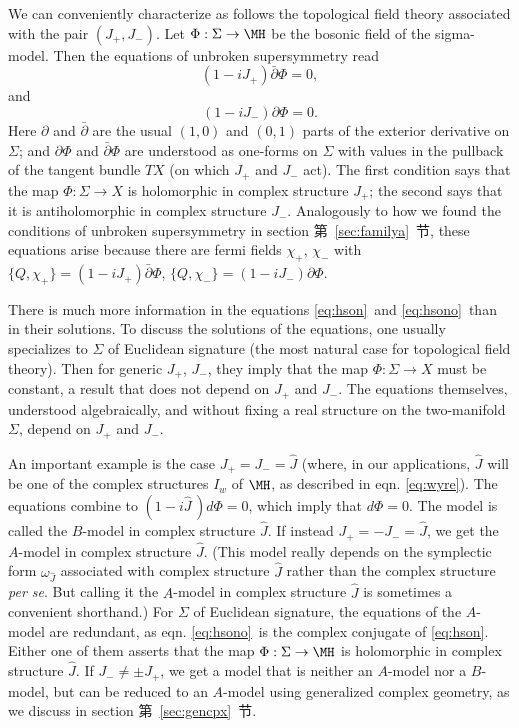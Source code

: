 We can conveniently characterize as follows the topological field
theory associated with the pair $(J_+,J_-)$.  Let $\Phi: \Sigma\to
\MH$ be the bosonic field of the sigma-model.   Then the equations
of unbroken supersymmetry read
\setcounter{equation}{4}
\begin{equation}\label{eq:hson}
(1-iJ_+)\bar\partial\Phi=0,
\end{equation}
 and
\setcounter{equation}{5}
\begin{equation}\label{eq:hsono}
(1-iJ_-)\partial \Phi=0.
\end{equation}
  Here $\partial$ and
$\bar\partial$ are the usual $(1,0)$ and $(0,1)$ parts of the
exterior derivative on $\Sigma$; and $\partial\Phi$ and
$\bar\partial \Phi$ are understood as one-forms on $\Sigma$ with
values in the pullback of the tangent bundle $TX$ (on which $J_+$
and $J_-$ act). The first condition says that the map
$\Phi:\Sigma\to X$ is holomorphic in complex structure $J_+$; the
second says that it is antiholomorphic in complex structure $J_-$.
Analogously to how we found the conditions of unbroken
supersymmetry in section 第~\ref{sec:familya}~节, these equations arise because
there are fermi fields $\chi_+$, $\chi_-$ with
$\{Q,\chi_+\}=(1-iJ_+)\bar\partial\Phi$,
$\{Q,\chi_-\}=(1-iJ_-)\partial\Phi$.

There is much more information in the equations \eqref{eq:hson}\ and \eqref{eq:hsono}\
than in their solutions. To discuss the solutions of the
equations, one usually specializes to $\Sigma$ of Euclidean
signature (the most natural case for topological field theory).
Then for generic $J_+$, $J_-$,  they imply that the map
$\Phi:\Sigma\to X$ must be constant, a result that does not depend
on $J_+$ and $J_-$.  The equations themselves, understood
algebraically, and without fixing a real structure on the
two-manifold $\Sigma$, depend on $J_+$ and $J_-$.

An important example is the case $J_+=J_-=\hat J$ (where, in our
applications, $\hat J$ will be one of the complex structures $I_w$
of $\MH$, as described in eqn. \eqref{eq:wyre}). The equations combine to
$(1-i\hat J\,)d\Phi = 0$, which imply that $d\Phi=0$. The model is
called the $B$-model in complex structure $\hat J$. If instead
$J_+=-J_-=\hat J$, we get the $A$-model in complex structure $\hat
J$. (This model really depends on the symplectic form
$\omega_{\hat J}$ associated with complex structure $\hat J$
rather than  the complex structure {\it per se}. But calling it
the $A$-model in complex structure $\hat J$ is sometimes a
convenient shorthand.) For $\Sigma$ of Euclidean signature, the
equations of the $A$-model are redundant, as eqn. \eqref{eq:hsono}\ is the
complex conjugate of \eqref{eq:hson}. Either one of them asserts that the
map $\Phi:\Sigma\to \MH$ is holomorphic in complex structure $\hat
J$. If $J_-\not= \pm J_+$, we get a model that is neither an
$A$-model nor a $B$-model, but can be reduced to an $A$-model
using generalized complex geometry, as we discuss in section
第~\ref{sec:gencpx}~节.

